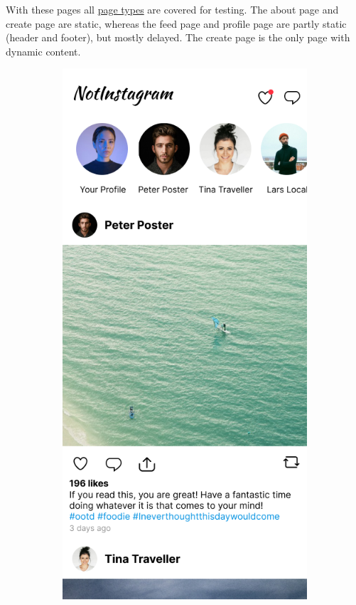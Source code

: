 \documentclass[a4paper, fontsize=11pt]{article}
\begin{document}
With these pages all \hyperref[enum:pagetypes]{page types} are covered for testing.
The about page and create page are static, whereas the feed page and profile page are partly static (header and footer), but mostly delayed.
The create page is the only page with dynamic content.

\begin{figure}[ht!]
  \begin{subfigure}{0.49\linewidth}
    \begin{center}
      \includegraphics[width=\linewidth, height=0.3\textheight, keepaspectratio]{img/ig-clone/Feed.png}

\end{center}
\end{subfigure}
\end{figure}
\end{document}
